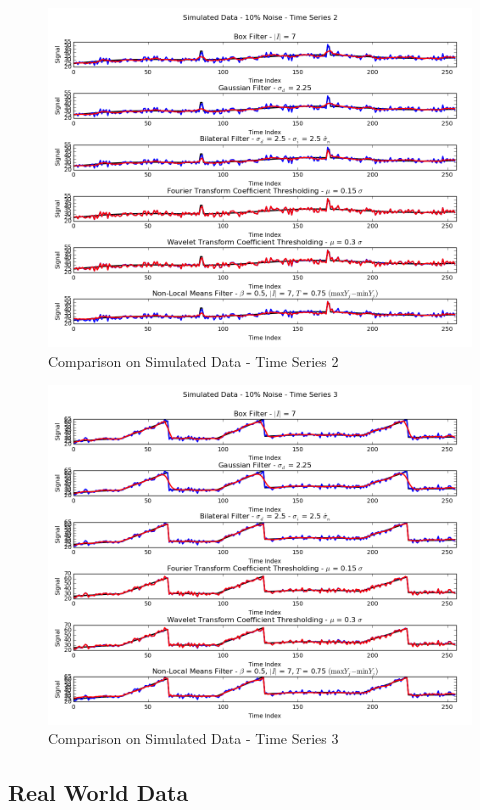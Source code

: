 \documentclass[11pt]{article}
\theoremstyle{definition}
\begin{document}
\begin{figure}[h!]
\centering
\includegraphics[width = 0.95 \textwidth]{TimeSeries2SimulatedCompare.png}
\caption{Comparison on Simulated Data - Time Series 2}
\label{timeseries2simulatedcompare}
\end{figure}

\begin{figure}[h!]
\centering
\includegraphics[width = 0.95 \textwidth]{TimeSeries3SimulatedCompare.png}
\caption{Comparison on Simulated Data - Time Series 3}
\label{timeseries3simulatedcompare}
\end{figure}


\subsection{Real World Data}
\end{document}
